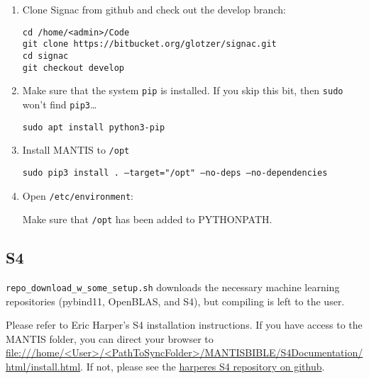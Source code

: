 \begin{enumerate}
\item Clone Signac from github and check out the develop branch:

	\texttt{cd /home/<admin>/Code} \\
	\texttt{git clone https://bitbucket.org/glotzer/signac.git} \\
	\texttt{cd signac} \\
	\texttt{git checkout develop}

\item Make sure that the system \texttt{pip} is installed. If you skip this bit, then \texttt{sudo} won't find \texttt{pip3}\dots

	\texttt{sudo apt install python3-pip}

\item Install MANTIS to \texttt{/opt}

\texttt{sudo pip3 install . --target="/opt" --no-deps --no-dependencies}

\item Open \texttt{/etc/environment}:
	
	Make sure that \texttt{/opt} has been added to PYTHONPATH.
\end{enumerate}

\subsection{S4} \label{subsec:S4compiling}

\texttt{repo\_download\_w\_some\_setup.sh} downloads the necessary machine learning repositories (pybind11, OpenBLAS, and S4), but compiling is left to the user.

Please refer to Eric Harper's S4 installation instructions. If you have access to the MANTIS folder, you can direct your browser to \url{file:///home/<User>/<PathToSyncFolder>/MANTISBIBLE/S4Documentation/html/install.html}. If not, please see the \href{https://github.com/harperes/S4}{harperes S4 repository on github}.
